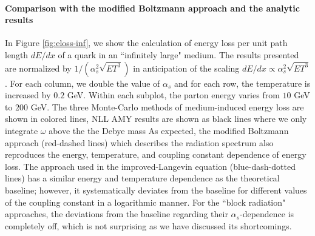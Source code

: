 \documentclass[aps, prc, reprint, amsmath, groupedaddress, nofootinbib]{revtex4-1}
\begin{document}
\begin{appendices}
\paragraph{Comparison with the modified Boltzmann approach and the analytic results}
In Figure \ref{fig:eloss-inf}, we show the calculation of energy loss per unit path length $dE/dx$ of a quark in an ``infinitely large" medium. 
The results presented are normalized by $1/(\alpha_s^2 \sqrt{ET^3})$ in anticipation of the scaling $dE/dx \propto \alpha_s^2 \sqrt{ET^3}$.
For each column, we double the value of $\alpha_s$ and for each row, the temperature is increased by $0.2$ GeV. 
Within each subplot, the parton energy varies from $10$ GeV to $200$ GeV.
The three Monte-Carlo methods of medium-induced energy loss are shown in colored lines, 
NLL AMY results are shown as black lines where we only integrate $\omega$ above the the Debye mass 
As expected, the modified Boltzmann approach (red-dashed lines) which describes the radiation spectrum also reproduces the energy, temperature, and coupling constant dependence of energy loss.
The  approach used in the improved-Langevin equation (blue-dash-dotted lines) has a similar energy and temperature dependence as the theoretical baseline; however, it systematically deviates from the baseline for different values of the coupling constant in a logarithmic manner.
For the ``block radiation" approaches, the deviations from the baseline regarding their $\alpha_s$-dependence is completely off, which is not surprising as we have discussed its shortcomings.

\end{appendices}
 
\end{document}
